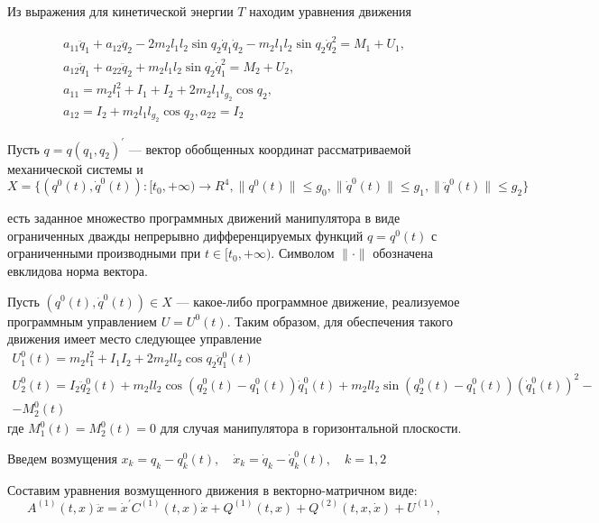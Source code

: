 Из выражения для кинетической энергии $T$ находим уравнения движения

\begin{equation}
\begin{array}{l}
a_{11} \ddot q_1 + a_{12} \ddot q_2 - 2 m_2 l_1 l_2 \sin q_2 \dot q_1 \dot q_2 - m_2 l_1 l_2 \sin q_2 \dot q_2^2 = M_1 + U_1,\\ 
a_{12} \ddot q_1 + a_{22} \ddot q_2 + m_2 l_1 l_2 \sin q_2 \dot q_1^2 = M_2 + U_2,\\
a_{11} = m_2 l_1^2 + I_1 + I_2 + 2 m_2 l_1 l_{g_2} \cos q_2,\\
a_{12} = I_2 + m_2 l_1 l_{g_2} \cos q_2, a_{22} = I_2
\end{array}
\end{equation}

Пусть $q=q(q_1, q_2)^{'}$ --– вектор обобщенных координат рассматриваемой механической системы и 
$$X = \{(q^0(t), \dot q^0(t)) : [t_0, + \infty) \to R^4, \|q^0(t)\| \le g_0, \|\dot q^0(t) \| \le g_1, \|\ddot q^0(t)\| \le g_2 \}$$

есть заданное множество программных движений манипулятора в виде ограниченных дважды непрерывно дифференцируемых функций $q=q^0(t)$ с ограниченными производными при $t \in [t_0, + \infty).$ Символом $\| \cdot \|$   обозначена евклидова норма вектора.

Пусть $(q^0(t), \dot q^0(t)) \in X$ --- какое-либо программное движение, реализуемое программным управлением $U = U^0(t).$ Таким образом, для обеспечения такого движения имеет место следующее управление
$$
\begin{array}{l}
U_1^0 (t) = m_2 l_1^2 + I_1 I_2 + 2 m_2 l l_2 \cos q_2 \ddot q_1^0 (t)\\
U_2^0 (t) = I_2 \ddot q_2^0 (t) + m_2 l l_2 \cos (q_2^0 (t) - q_1^0 (t)) \dot q_1^0 (t) + m_2 l l_2 \sin(q_2^0 (t) - q_1^0 (t)) (\dot q_1^0 (t))^2 -\\
- M_2^0(t)
\end{array}
$$
где $M_1^0(t) = M_2^0(t) = 0$ для случая манипулятора в горизонтальной плоскости.

Введем возмущения $x_k = q_k - q_k^0(t), \quad \dot x_k = \dot q_k - \dot q_k^0(t), \quad k = 1, 2$

Составим уравнения возмущенного движения в векторно-матричном виде:
\begin{equation}
A^{(1)}(t, x) \ddot x = {\dot x^{'} C^{(1)}(t, x) \dot x} + Q^{(1)}(t,x) + Q^{(2)}(t, x, \dot x) + U^{(1)}, \label{2.2'}
\end{equation}

